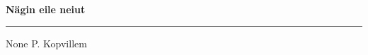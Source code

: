 \documentclass[10pt]{book}
\begin{document}
{
  \samepage
  \raggedbottom
  \raggedright
  \sloppy


  \vspace{0.2in}

  \noindent\begin{minipage}{.1\textwidth}
    \hfill\vspace{0.1in}
  \end{minipage}%
  \noindent\begin{minipage}{.8\textwidth}
    \centering
    \bfseries
    \large N\"agin eile neiut
  \end{minipage}%
  \noindent\begin{minipage}{.1\textwidth}
      \hfill\vspace{0.1in}
  \end{minipage}

  \nopagebreak[4]
  \vspace{0.1in}
  \nopagebreak[4]
  \hrule height 0.05ex
  \nopagebreak[4]
  \vspace{-0.05in}

  {\footnotesize None \hfill P. Kopvillem }\\
  \vspace{0.01in}



}
\end{document}
